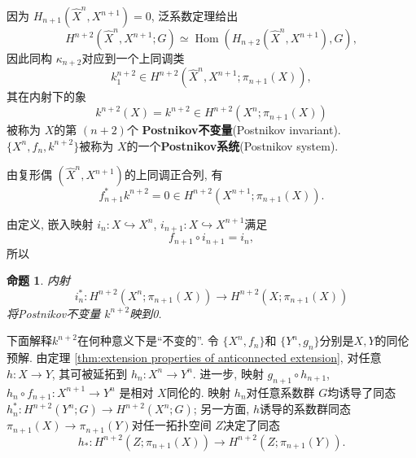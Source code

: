 \documentclass{ctexart}
\theoremstyle{plain}
\newtheorem{proposition}[theorem]{命题}
\theoremstyle{definition}
\renewcommand{\emph}{\textbf}
\begin{document}
        因为 $H_{n+1}(\hat{X}^{n},X^{n+1})=0$, 泛系数定理给出
        \begin{equation*}
          H^{n+2}(\hat{X}^{n},X^{n+1};G)\simeq \operatorname{Hom}(H_{n+2}(\hat{X}^{n},X^{n+1}),G),
        \end{equation*}
        因此同构 $\kappa_{n+2}$对应到一个上同调类 
        \begin{equation*}
          k^{n+2}_{1}\in H^{n+2}(\hat{X}^{n},X^{n+1};\pi_{n+1}(X)),
        \end{equation*}
        其在内射下的象
        \begin{equation*}
          k^{n+2}(X)=k^{n+2}\in H^{n+2}(X^{n};\pi_{n+1}(X))
        \end{equation*}
        被称为 $X$的第 $(n+2)$个 \emph{Postnikov不变量}(Postnikov invariant). $\{X^{n},f_{n},k^{n+2}\}$被称为 $X$的一个\emph{Postnikov系统}(Postnikov system).

        由复形偶 $(\hat{X}^{n},X^{n+1})$的上同调正合列, 有 
        \begin{equation}
          f^{*}_{n+1}k^{n+2}=0\in H^{n+2}(X^{n+1};\pi_{n+1}(X)).
        \end{equation}

        由定义, 嵌入映射 $i_{n}:X\hookrightarrow X^{n}$, $i_{n+1}:X\hookrightarrow X^{n+1}$满足
        \begin{equation*}
          f_{n+1}\circ i_{n+1}=i_{n},
        \end{equation*}
        所以 

        \begin{proposition}
            内射
            \begin{equation*}
              i^{*}_{n}:H^{n+2}(X^{n};\pi_{n+1}(X))\to H^{n+2}(X;\pi_{n+1}(X))
            \end{equation*}
            将Postnikov不变量 $k^{n+2}$映到0.
        \end{proposition}

        下面解释$k^{n+2}$在何种意义下是``不变的''. 令 $\{X^{n},f_{n}\}$和 $\{Y^{n},g_{n}\}$分别是$X, Y$的同伦预解. 由定理 \ref{thm:extension properties of anticonnected extension}, 对任意 $h:X\to Y$, 其可被延拓到 $h_{n}:X^{n}\to Y^{n}$. 进一步, 映射 $g_{n+1}\circ h_{n+1}$, $h_{n}\circ f_{n+1}:X^{n+1}\to Y^{n}$ 是相对 $X$同伦的. 映射 $h_{n}$对任意系数群 $G$均诱导了同态 $h^{*}_{n}:H^{n+2}(Y^{n};G)\to H^{n+2}(X^{n};G)$; 另一方面, $h$诱导的系数群同态 $\pi_{n+1}(X)\to \pi_{n+1}(Y)$对任一拓扑空间 $Z$决定了同态
        \begin{equation*}
          h_*:H^{n+2}(Z;\pi_{n+1}(X))\to H^{n+2}(Z;\pi_{n+1}(Y)).
        \end{equation*}
\end{document}
